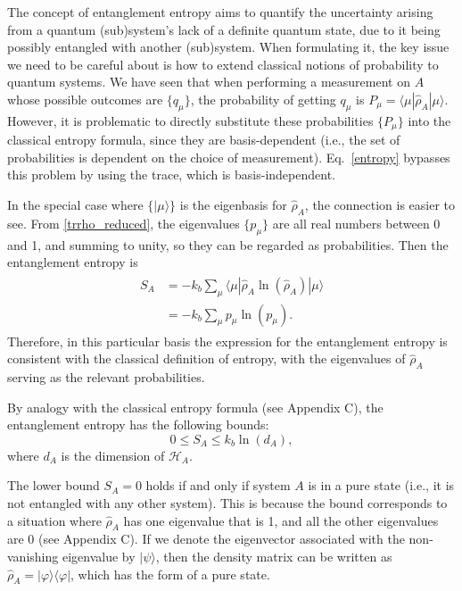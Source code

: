 \documentclass[pra,12pt]{revtex4-2}
\begin{document}
The concept of entanglement entropy aims to quantify the uncertainty
arising from a quantum (sub)system's lack of a definite quantum state,
due to it being possibly entangled with another (sub)system.  When
formulating it, the key issue we need to be careful about is how to
extend classical notions of probability to quantum systems.  We have
seen that when performing a measurement on $A$ whose possible outcomes
are $\{q_\mu\}$, the probability of getting $q_\mu$ is $P_\mu =
\langle \mu | \hat{\rho}_A|\mu\rangle$.  However, it is problematic to
directly substitute these probabilities $\{P_\mu\}$ into the classical
entropy formula, since they are basis-dependent (i.e., the set of
probabilities is dependent on the choice of measurement).
Eq.~\eqref{entropy} bypasses this problem by using the trace, which is
basis-independent.

In the special case where $\{|\mu\rangle\}$ is the eigenbasis for
$\hat{\rho}_A$, the connection is easier to see.  From
\eqref{trrho_reduced}, the eigenvalues $\{p_\mu\}$ are all real numbers
between 0 and 1, and summing to unity, so they can be regarded as
probabilities.  Then the entanglement entropy is
\begin{align}
  \begin{aligned}
    S_A &= -k_b \sum_\mu \langle \mu | \hat{\rho}_A \ln(\hat{\rho}_A) | \mu\rangle  \\
    &= - k_b \sum_\mu p_\mu \ln(p_\mu).
  \end{aligned}
\end{align}
Therefore, in this particular basis the expression for the
entanglement entropy is consistent with the classical definition of
entropy, with the eigenvalues of $\hat{\rho}_A$ serving as the
relevant probabilities.

By analogy with the classical entropy formula (see Appendix C), the
entanglement entropy has the following bounds:
\begin{equation}
  0 \le S_A \le k_b\ln(d_A),
  \label{Sabounds}
\end{equation}
where $d_A$ is the dimension of $\mathscr{H}_A$.

The lower bound $S_A = 0$ holds if and only if system $A$ is in a pure
state (i.e., it is not entangled with any other system).  This is
because the bound corresponds to a situation where $\hat{\rho}_A$ has
one eigenvalue that is 1, and all the other eigenvalues are 0 (see
Appendix C).  If we denote the eigenvector associated with the
non-vanishing eigenvalue by $|\psi\rangle$, then the density matrix
can be written as $\hat{\rho}_A = |\varphi\rangle\langle\varphi|$, which
has the form of a pure state.
\end{document}
